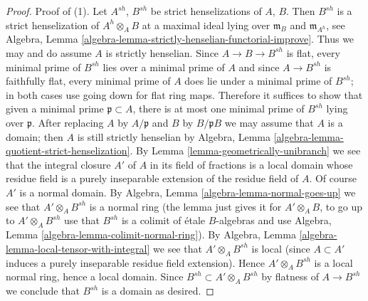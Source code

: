 \documentclass[10pt,a4paper]{amsart}
\theoremstyle{plain}
\theoremstyle{definition}
\theoremstyle{remark}
\numberwithin{equation}{subsection}
\begin{document}
\begin{proof}
\medskip\noindent
Proof of (1). Let $A^{sh}$, $B^{sh}$ be strict henselizations
of $A$, $B$. Then $B^{sh}$ is a strict henselization of
$A^h \otimes_A B$ at a maximal ideal lying over $\mathfrak m_B$
and $\mathfrak m_{A^h}$, see
Algebra, Lemma \ref{algebra-lemma-strictly-henselian-functorial-improve}.
Thus we may and do assume $A$ is strictly henselian.
Since $A \to B \to B^{sh}$ is flat, every minimal prime of $B^{sh}$
lies over a minimal prime of $A$ and since $A \to B^{sh}$ is faithfully flat,
every minimal prime of $A$ does lie under a minimal prime of $B^{sh}$;
in both cases use going down for flat ring maps.
Therefore it suffices to show that given a minimal prime
$\mathfrak p \subset A$, there is at most one minimal prime
of $B^{sh}$ lying over $\mathfrak p$.
After replacing $A$ by $A/\mathfrak p$ and $B$ by $B/\mathfrak p B$
we may assume that $A$ is a domain; then $A$ is still strictly henselian by
Algebra, Lemma \ref{algebra-lemma-quotient-strict-henselization}.
By Lemma \ref{lemma-geometrically-unibranch} we see that the integral closure
$A'$ of $A$ in its field of fractions is a local domain whose residue
field is a purely inseparable extension of the residue field of $A$.
Of course $A'$ is a normal domain. By
Algebra, Lemma \ref{algebra-lemma-normal-goes-up}
we see that $A' \otimes_A B^{sh}$ is a normal ring
(the lemma just gives it for $A' \otimes_A B$, to go up to
$A' \otimes_A B^{sh}$ use that $B^{sh}$ is a colimit of \'etale
$B$-algebras and use Algebra, Lemma \ref{algebra-lemma-colimit-normal-ring}).
By Algebra, Lemma \ref{algebra-lemma-local-tensor-with-integral}
we see that $A' \otimes_A B^{sh}$ is local (since $A \subset A'$
induces a purely inseparable residue field extension).
Hence $A' \otimes_A B^{sh}$ is a local normal ring, hence a local domain.
Since $B^{sh} \subset A' \otimes_A B^{sh}$ by flatness of $A \to B^{sh}$
we conclude that $B^{sh}$ is a domain as desired.
\end{proof}
\end{document}
